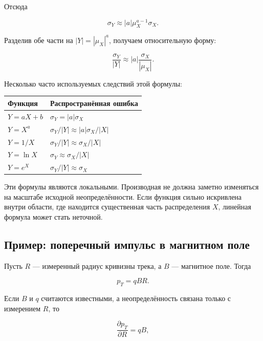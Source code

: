 \documentclass[
  russian,
  12pt,
  a4paper,
  a4paper,
  openany]{scrbook}
\newcounter{none} %
\begin{document}
Отсюда

\[
\sigma_Y\approx |a|\mu_X^{a-1}\sigma_X.
\]

Разделив обе части на \(|Y|=|\mu_X|^a\), получаем относительную форму:

\[
\boxed{
\frac{\sigma_Y}{|Y|}
\approx
|a|\frac{\sigma_X}{|\mu_X|}.
}
\]

Несколько часто используемых следствий этой формулы:

{\def\LTcaptype{none} %
\begin{longtable}[]{@{}ll@{}}
\toprule\noalign{}
Функция & Распространённая ошибка \\
\midrule\noalign{}
\endhead
\bottomrule\noalign{}
\endlastfoot
\(Y=aX+b\) & \(\sigma_Y=|a|\sigma_X\) \\
\(Y=X^a\) & \(\sigma_Y/|Y|\approx |a|\sigma_X/|X|\) \\
\(Y=1/X\) & \(\sigma_Y/|Y|\approx \sigma_X/|X|\) \\
\(Y=\ln X\) & \(\sigma_Y\approx \sigma_X/|X|\) \\
\(Y=e^X\) & \(\sigma_Y/|Y|\approx \sigma_X\) \\
\end{longtable}
}

\begin{booknote}

Эти формулы являются локальными. Производная не должна заметно
изменяться на масштабе исходной неопределённости. Если функция сильно
искривлена внутри области, где находится существенная часть
распределения \(X\), линейная формула может стать неточной.

\end{booknote}

\subsection{Пример: поперечный импульс в магнитном
поле}\label{ux43fux440ux438ux43cux435ux440-ux43fux43eux43fux435ux440ux435ux447ux43dux44bux439-ux438ux43cux43fux443ux43bux44cux441-ux432-ux43cux430ux433ux43dux438ux442ux43dux43eux43c-ux43fux43eux43bux435}

Пусть \(R\) --- измеренный радиус кривизны трека, а \(B\) --- магнитное
поле. Тогда

\[
p_T=qBR.
\]

Если \(B\) и \(q\) считаются известными, а неопределённость связана
только с измерением \(R\), то

\[
\frac{\partial p_T}{\partial R}=qB,
\]
\end{document}
